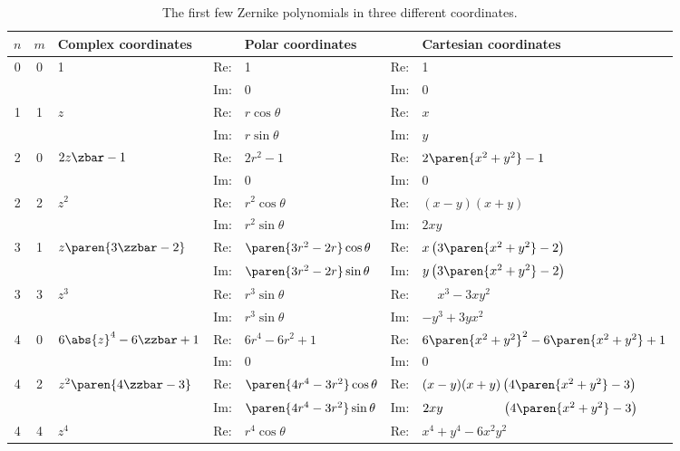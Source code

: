 \begin{landscape}
\begin{table}[htdp]
\caption[The first few Zernike polynomials in three different coordinates]{The first few Zernike polynomials in three different coordinates. }
\begin{center}
{\scriptsize
\begin{tabular}{cclllll}
%
 $n$ & $m$ & Complex coordinates && Polar coordinates && Cartesian coordinates \\\hline
%
 0 & 0 & 1 & Re: & 1 & Re: & 1 \\[2pt]
   &   &   & Im: & 0 & Im: & 0 \\[4pt]
%
  1 & 1 & $z$ & Re: & $r\cos\theta$ & Re: & $x$ \\[2pt]
    &   &     & Im: & $r\sin\theta$ & Im: & $y$ \\[4pt]
%
  2 & 0 & $2z\zbar-1$ 
    & Re: & $2r^{2}-1$ & Re: & $2\paren{x^{2} + y^{2}}-1$ \\[2pt]
    &   &        
    & Im: & 0 & Im: & 0 \\[2pt]
  2 & 2 & $z^{2}$ 
    & Re: & $r^{2}\cos\theta$ & Re: & $(x-y) (x+y)$ \\[2pt]
    &   &         
    & Im: & $r^{2}\sin\theta$ & Im: & $2xy$ \\[4pt]
%
  3 & 1 & $z\paren{3\zzbar-2}$ 
    & Re: & $\paren{3r^{2}-2r}\cos\theta$ 
    & Re: & $x \left(3 \paren{x^2 + y^2} - 2\right)$ \\[2pt]
    &   &         
    & Im: & $\paren{3r^{2}-2r}\sin\theta$ 
    & Im: & $y \left(3 \paren{x^2 + y^2} - 2\right)$ \\[2pt]
  3 & 3 & $z^{3}$ 
    & Re: & $r^{3}\sin\theta$ 
    & Re: & $\phantom{-}x^{3} - 3xy^{2}$ \\[2pt]
    &   &         
    & Im: & $r^{3}\sin\theta$ 
    & Im: & $-y^{3} + 3yx^{2}$ \\[4pt]
%
  4 & 0 & $6\abs{z}^{4}-6\zzbar+1$ & Re: & $6r^{4}-6r^{2}+1$ & Re: & $6\paren{x^{2} + y^{2}}^{2}-6\paren{x^{2} + y^{2}} + 1$ \\[2pt]
    &   &         & Im: & 0 & Im: & 0 \\[2pt]
  4 & 2 & $z^{2}\paren{4\zzbar-3}$ & Re: & $\paren{4r^{4}-3r^{2}}\cos\theta$ 
    & Re: & $(x-y) (x+y) \left(4 \paren{x^2 + y^2}-3\right)$ \\[2pt]
    &   &         
    & Im: & $\paren{4r^{4}-3r^{2}}\sin\theta$& Im: & $2 x y \qquad \qquad \ \ \left(4 \paren{x^2 + y^2}-3\right)$ \\[2pt]
  4 & 4 & $z^{4}$ & Re: & $r^{4}\cos\theta$ & Re: & $x^4+y^4-6 x^2 y^2$ \\[2pt]

\end{tabular}}
\end{center}
\end{table}
\end{landscape}
